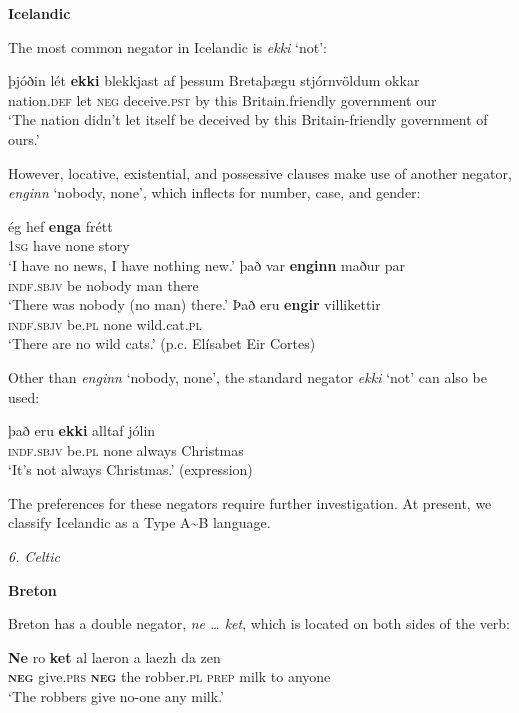 \documentclass[output=paper]{langsci/langscibook}
\begin{document}
\begin{unindented}
\textbf{Icelandic}

The most common negator in Icelandic is \textit{ekki} `not': 
%
\begin{exe}\ex \gll þjóðin lét   \textbf{ekki}   blekkjast   af   þessum 
Bretaþægu stjórnvöldum   okkar \\
nation.\textsc{def} let \textsc{neg} deceive.\textsc{pst} by this   
Britain.friendly   government our \\
    \glt `The nation didn't let itself be deceived by this Britain-friendly government of ours.' \citep[286]{Wood2012}
    \end{exe}

However, locative, existential, and possessive clauses make use of another negator, \textit{enginn} `nobody, none', which inflects for number, case, and gender: 
%
\begin{exe}\ex \gll ég hef \textbf{enga} frétt \\
\textsc{1sg} have none story \\
    \glt `I have no news, I have nothing new.' \citep[62]{Bjarnason1998}
\ex \gll það var \textbf{enginn}  maður par \\
\textsc{indf.sbjv} be   nobody man    there \\
    \glt `There was nobody (no man) there.' \citet[123]{Einarsson1949} 
\ex \gll Það eru    \textbf{engir} villikettir \\
\textsc{indf.sbjv} be.\textsc{pl} none   wild.cat.\textsc{pl} \\
    \glt `There are no wild cats.' (p.c. Elísabet Eir Cortes)
    \end{exe}

Other than \textit{enginn} `nobody, none', the standard negator \textit{ekki} `not' can also be used:
%
\begin{exe}\ex \gll það eru \textbf{ekki} alltaf    jólin \\
\textsc{indf.sbjv} be.\textsc{pl} none always Christmas \\
    \glt `It's not always Christmas.' (expression)
    \end{exe}

The preferences for these negators require further investigation.  At present, we classify Icelandic as a Type A{\textasciitilde}B language. 

\textit{6. Celtic}

\textbf{Breton}

Breton has a double negator, \textit{ne … ket}, which is located on both sides of the verb:
%
\begin{exe}\ex \gll \textbf{Ne} ro \textbf{ket}   al  laeron a laezh da zen \\
\textbf{\textsc{neg}} give.\textsc{prs} \textbf{\textsc{neg}} the robber.\textsc{pl} \textsc{prep} milk   to anyone \\
    \glt `The robbers give no-one any milk.' \citet[126]{Press1986}
    \end{exe}


\end{unindented}
\end{document}
